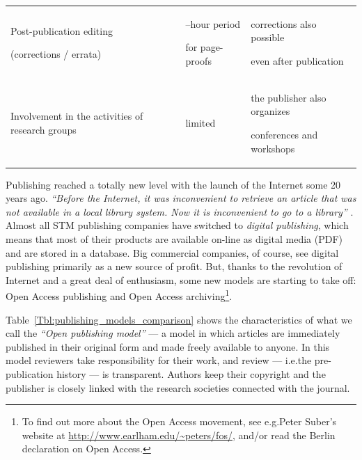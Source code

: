 \documentclass[graybox,envcountchap,sectrefs,UStrade]{svmono}
\begin{document}
\begin{table}[!hbt]
\begin{tabular}{m{}m{}m{}}
Post-publication editing \par (corrections / errata) & \parbox[c]{.32\textwidth}{--hour period \par for page-proofs} & \parbox[c]{.32\textwidth}{\centering corrections also possible \par even after publication} \\
 Involvement in the activities of research groups  & \parbox[c]{.32\textwidth}{\centering limited } & \parbox[c]{.32\textwidth}{\centering the publisher also organizes \par conferences and workshops} \\
\bottomrule
\end{tabular}
\end{table}

Publishing reached a totally new level with the launch of the Internet some 20 years ago. \emph{``Before the Internet, it was inconvenient to retrieve an article that was not available in a local library system. Now it is inconvenient to go to a library''} \citep{Collins2005JACR}. Almost all STM publishing companies have switched to \emph{digital publishing}, which means that most of their products are available on-line as digital media (PDF) and are stored in a database. Big commercial companies, of course, see digital publishing primarily as a new source of profit. But, thanks to the revolution of Internet and a great deal of enthusiasm, some new models are starting to take off: Open Access publishing and Open Access archiving\footnote{To find out more about the Open Access movement, see e.g.\@ Peter Suber's website at \url{http://www.earlham.edu/~peters/fos/}, and/or read the Berlin declaration on Open Access.}.\par

Table~\ref{Tbl:publishing_models_comparison} shows the characteristics of what we call the \emph{``Open publishing model''} --- a model in which articles are immediately published in their original form and made freely available to anyone. In this model reviewers take responsibility for their work, and review --- i.e.\@ the pre-publication history --- is transparent. Authors keep their copyright and the publisher is closely linked with the research societies connected with the journal. \par
\end{document}
